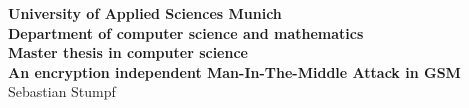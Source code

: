 \begin{center}
	\bigskip \bigskip \bigskip 
	\vspace*{0.8cm}
	\huge \textbf{University of Applied Sciences Munich} \\
	\bigskip \bigskip \bigskip
	{\huge \textbf{Department of computer science and mathematics}} \\
	\bigskip \bigskip \bigskip 
	{\Large \textbf{Master thesis in computer science}} \\
	\bigskip \bigskip \bigskip \bigskip \bigskip
	{\Huge \textbf{An encryption independent Man-In-The-Middle Attack in GSM}} \\  
	\bigskip \bigskip \bigskip
	{\Large Sebastian Stumpf} \\
\end{center}
\vfill